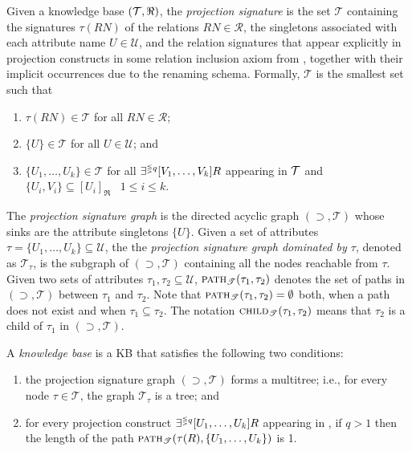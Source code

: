 \documentclass[envcountsame,draft]{llncs}
\newcommand{\pth}[2]{\ensuremath{\textsc{path}_{\mathscr{T}}(#1,#2)}\xspace}
\newcommand{\chd}[2]{\ensuremath{\textsc{child}_{\mathscr{T}}(#1,#2)}\xspace}
\begin{document}
Given a \DLRp knowledge base $(\mathcal{T},\Re)$, the \emph{projection signature} is the set $\mathscr{T}$ 
containing the signatures $\tau(R\!N)$ of the relations $R\!N\in\mathcal{R}$, the singletons associated with each attribute 
name $U\in\mathcal{U}$, and the relation signatures that appear explicitly in projection constructs in some relation 
inclusion axiom from \Tmc, together with their implicit occurrences due to the renaming schema. Formally, 
$\mathscr{T}$ is the smallest set such that
%
\begin{enumerate}
	\item $\tau(R\!N)\in\mathscr{T}$ for all $R\!N\in\mathcal{R}$; 
	\item $\{U\}\in\mathscr{T}$ for all $U\in\mathcal{U}$; and
	\item $\{U_1,\ldots,U_k\}\in\mathscr{T}$ for all $\exists^{{\scriptscriptstyle\lesseqgtr} q} [V_1,\ldots,V_k]R$ appearing in $\mathcal{T}$ and 
		$\{U_i,V_i\}\subseteq [U_i]_\Re $ ~$1\!\leq\!i\!\leq\!k$. 
\end{enumerate}
%
The \emph{projection signature graph} is the directed acyclic graph $(\supset,\mathscr{T})$ whose sinks are the attribute 
singletons $\{U\}$. 
%
Given a set of attributes $\tau=\{U_1,\ldots,U_k\}\subseteq\mathcal{U}$, the
the \emph{projection signature graph dominated by $\tau$}, denoted as $\mathscr{T}_\tau$, is the subgraph 
of $(\supset,\mathscr{T})$ containing all the nodes reachable from $\tau$.
%
%
Given two sets of attributes $\tau_1,\tau_2\subseteq\mathcal{U}$, $\pth{\tau_1}{\tau_2}$ denotes the set of paths in 
$(\supset,\mathscr{T})$ between $\tau_1$ and $\tau_2$. Note that $\pth{\tau_1}{\tau_2}=\emptyset$ both, when a path 
does not exist and when $\tau_1\subseteq \tau_2$.
The notation $\chd{\tau_1}{\tau_2}$ means that ${\tau_2}$ is a child of ${\tau_1}$ in $(\supset,\mathscr{T})$.
%
\begin{definition}
A \emph{\DLRpm knowledge base} is a \DLRp KB that satisfies the following two conditions:
\begin{enumerate}
\item the projection signature graph $(\supset,\mathscr{T})$ forms a multitree; i.e., for every node
	$\tau\in\mathscr{T}$, the graph $\mathscr{T}_\tau$ is a tree; and
\item for every projection construct $\exists^{{\scriptscriptstyle\lesseqgtr} q} [U_1,\ldots,U_k]R$ appearing in \Tmc, if $q>1$ then the
	length of the path $\pth{\tau(R)}{\{U_1,\ldots,U_k\}}$ is 1.
\end{enumerate}
\end{definition}
\end{document}
